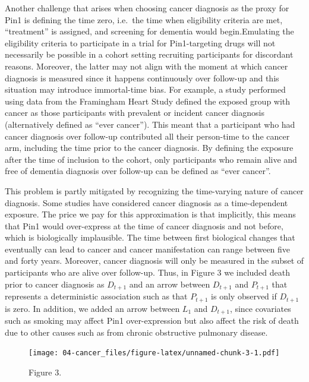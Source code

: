 \documentclass[
]{book}
\begin{document}
Another challenge that arises when choosing cancer diagnosis as the proxy for Pin1 is defining the time zero, i.e.~the time when eligibility criteria are met, ``treatment'' is assigned, and screening for dementia would begin\autocite{hernan2016}.Emulating the eligibility criteria to participate in a trial for Pin1-targeting drugs will not necessarily be possible in a cohort setting recruiting participants for discordant reasons. Moreover, the latter may not align with the moment at which cancer diagnosis is measured since it happens continuously over follow-up and this situation may introduce immortal-time bias\autocite{hernan2016}. For example, a study performed using data from the Framingham Heart Study\autocite{driver2012} defined the exposed group with cancer as those participants with prevalent or incident cancer diagnosis (alternatively defined as ``ever cancer''\autocite{hanson2016}). This meant that a participant who had cancer diagnosis over follow-up contributed all their person-time to the cancer arm, including the time prior to the cancer diagnosis. By defining the exposure after the time of inclusion to the cohort, only participants who remain alive and free of dementia diagnosis over follow-up can be defined as ``ever cancer''\autocite[\textcite{hernan2016}]{anderson1983}.

This problem is partly mitigated by recognizing the time-varying nature of cancer diagnosis. Some studies have considered cancer diagnosis as a time-dependent exposure\autocite{white2013,hanson2016,bowles2017}. The price we pay for this approximation is that implicitly, this means that Pin1 would over-express at the time of cancer diagnosis and not before, which is biologically implausible. The time between first biological changes that eventually can lead to cancer and cancer manifestation can range between five and forty years\autocite{nadler2013}. Moreover, cancer diagnosis will only be measured in the subset of participants who are alive over follow-up. Thus, in Figure 3 we included death prior to cancer diagnosis as \(D_{t+1}\) and an arrow between \(D_{t+1}\) and \(P_{t+1}\) that represents a deterministic association such as that \(P_{t+1}\) is only observed if \(D_{t+1}\) is zero. In addition, we added an arrow between \(L_1\) and \(D_{t+1}\), since covariates such as smoking may affect Pin1 over-expression but also affect the risk of death due to other causes such as from chronic obstructive pulmonary disease.

\begin{figure}
\centering
\texttt{[image: 04-cancer\_files/figure-latex/unnamed-chunk-3-1.pdf]}
\caption{\label{fig:unnamed-chunk-3}Figure 3.}
\end{figure}
\end{document}

